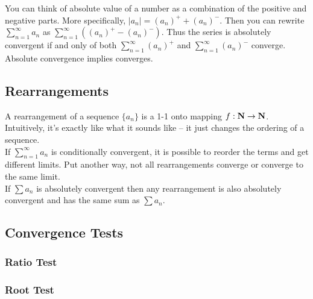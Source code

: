     You can think of absolute value of a number as a combination of the positive and negative 
    parts. More specifically, $|a_n| = (a_n)^+ + (a_n)^-$. Then you can rewrite 
    $\sum_{n=1}^{\infty} a_n$ as $\sum_{n=1}^{\infty} ((a_n)^+ - (a_n)^-)$. Thus the series
    is absolutely convergent if and only of both $\sum_{n=1}^{\infty} (a_n)^+$ and 
    $\sum_{n=1}^{\infty} (a_n)^-$ converge.\\

    \thm Absolute convergence implies converges.\\

    \pf {}

  \subsection{Rearrangements}
    A rearrangement of a sequence $\{a_n\}$ is a 1-1 onto mapping $f:\mathbf{N} \to \mathbf{N}$.
    Intuitively, it's exactly like what it sounds like -- it just changes the ordering of a 
    sequence.\\

    If $\sum_{n=1}^{\infty} a_n$ is conditionally convergent, it is possible to reorder the terms
    and get different limits. Put another way, not all rearrangements converge or converge to 
    the same limit.\\
    \thm If $\sum a_n$ is absolutely convergent then any rearrangement is also absolutely 
    convergent and has the same sum as $\sum a_n$.\\

    \pf {} 
  \subsection{Convergence Tests}
    \subsubsection{Ratio Test}
    \subsubsection{Root Test}

